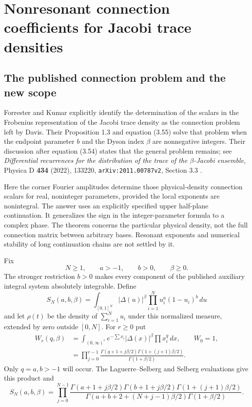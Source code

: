 \documentclass[11pt,a4paper]{article}
\theoremstyle{definition}
\theoremstyle{remark}
\numberwithin{equation}{section}
\begin{document}
\section{Nonresonant connection coefficients for Jacobi trace densities}
\label{p2:sec:jacobi-connection}

\subsection{The published connection problem and the new scope}

Forrester and Kumar explicitly identify the determination of the scalars
in the Frobenius representation of the Jacobi trace density as the
connection problem left by Davis.  Their Proposition 1.3 and equation
(3.55) solve that problem when the endpoint parameter $b$ and the Dyson
index $\beta$ are nonnegative integers.  Their discussion after equation
(3.54) states that the general problem remains; see
\emph{Differential recurrences for the distribution of the trace of the
$\beta$-Jacobi ensemble}, Physica D \textbf{434} (2022), 133220,
\texttt{arXiv:2011.00787v2}, Section 3.3 \cite{p8:SFB_FK}.

Here the corner Fourier amplitudes determine those physical-density
connection scalars for real, noninteger parameters, provided the local
exponents are nonintegral.  The answer uses an explicitly specified upper
half-plane continuation.  It generalizes the sign in the integer-parameter
formula to a complex phase.  The theorem concerns the particular physical
density, not the full connection matrix between arbitrary bases.  Resonant
exponents and numerical stability of long continuation chains are not
settled by it.

Fix
\begin{equation}\label{p2:eq:JC-parameters}
 N\ge1,\qquad a>-1,\qquad b>0,\qquad \beta\ge0.
\end{equation}
The stronger restriction $b>0$ makes every component of the published
auxiliary integral system absolutely integrable.  Define
\[
 S_N(a,b,\beta)=\int_{[0,1]^N}|\Delta(u)|^\beta
                    \prod_{i=1}^N u_i^a(1-u_i)^b\,du
\]
and let $\rho(t)$ be the density of $\sum_{i=1}^N u_i$ under this
normalized measure, extended by zero outside $[0,N]$.
For $r\ge0$ put
\begin{align*}
 W_r(q,\beta)
 &=\int_{(0,\infty)^r}e^{-\sum x_i}|\Delta(x)|^\beta
                                  \prod x_i^q\,dx,\qquad W_0=1,\\
 &=\prod_{j=0}^{r-1}
   \frac{\Gamma(q+1+j\beta/2)\Gamma(1+(j+1)\beta/2)}
        {\Gamma(1+\beta/2)}.
\end{align*}
Only $q=a,b>-1$ will occur.  The Laguerre--Selberg and Selberg
evaluations give this product and
\[
 S_N(a,b,\beta)=\prod_{j=0}^{N-1}
 \frac{\Gamma(a+1+j\beta/2)\Gamma(b+1+j\beta/2)
              \Gamma(1+(j+1)\beta/2)}
 {\Gamma(a+b+2+(N+j-1)\beta/2)\Gamma(1+\beta/2)}.
\]
\end{document}
